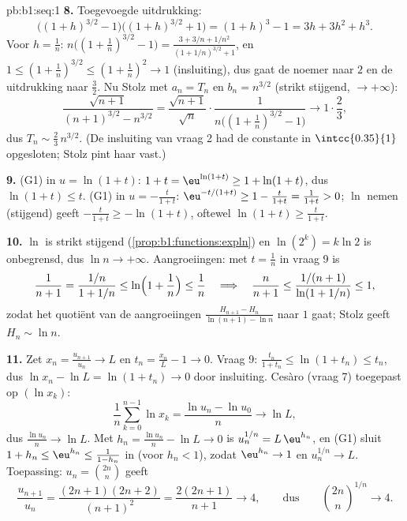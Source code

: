 \begin{solution}{pb:b1:seq:1}
\textbf{8.} Toegevoegde uitdrukking:
\[
\bigl((1+h)^{3/2} - 1\bigr)\bigl((1+h)^{3/2} + 1\bigr)
= (1+h)^3 - 1 = 3h + 3h^2 + h^3 .
\]
Voor $h = \frac1n$: $n\bigl((1 + \frac1n)^{3/2} - 1\bigr) = \frac{3 + 3/n
+ 1/n^2}{(1 + 1/n)^{3/2} + 1}$, en $1 \leq (1 + \frac1n)^{3/2} \leq (1 +
\frac1n)^2 \to 1$ (insluiting), dus gaat de noemer naar $2$ en de
uitdrukking naar $\frac32$. Nu Stolz met $a_n = T_n$ en $b_n = n^{3/2}$
(strikt stijgend, $\to +\infty$):
\[
\frac{\sqrt{n+1}}{(n+1)^{3/2} - n^{3/2}}
= \frac{\sqrt{n+1}}{\sqrt n} \cdot
\frac{1}{n\bigl((1 + \frac1n)^{3/2} - 1\bigr)}
\longrightarrow 1 \cdot \frac{2}{3},
\]
dus $T_n \sim \frac23\,n^{3/2}$. (De insluiting van vraag 2 had de
constante in $\intcc{0.35}{1}$ opgesloten; Stolz pint haar vast.)

\textbf{9.} (G1) in $u = \ln(1+t)$: $1 + t = \eu^{\ln(1+t)} \geq 1 +
\ln(1+t)$, dus $\ln(1+t) \leq t$. (G1) in $u = -\frac{t}{1+t}$:
$\eu^{-t/(1+t)} \geq 1 - \frac{t}{1+t} = \frac{1}{1+t} > 0$; $\ln$ nemen
(stijgend) geeft $-\frac{t}{1+t} \geq -\ln(1+t)$, oftewel $\ln(1+t) \geq
\frac{t}{1+t}$.

\textbf{10.} $\ln$ is strikt stijgend (\cref{prop:b1:functions:expln}) en
$\ln(2^k) = k\ln 2$ is onbegrensd, dus $\ln n \to +\infty$.
Aangroeiingen: met $t = \frac1n$ in vraag 9 is
\[
\frac 1{n+1} = \frac{1/n}{1 + 1/n} \leq
\ln\Bigl(1 + \frac1n\Bigr) \leq \frac1n
\quad\Longrightarrow\quad
\frac{n}{n+1} \leq \frac{1/(n+1)}{\ln(1 + 1/n)} \leq 1 ,
\]
zodat het quotiënt van de aangroeiingen $\frac{H_{n+1} -
H_n}{\ln(n+1) - \ln n}$ naar $1$ gaat; Stolz geeft $H_n \sim \ln n$.

\textbf{11.} Zet $x_n = \frac{u_{n+1}}{u_n} \to L$ en $t_n =
\frac{x_n}{L} - 1 \to 0$. Vraag 9: $\frac{t_n}{1 + t_n} \leq \ln(1 + t_n)
\leq t_n$, dus $\ln x_n - \ln L = \ln(1 + t_n) \to 0$ door insluiting.
Cesàro (vraag 7) toegepast op $(\ln x_k)$:
\[
\frac1n \sum_{k=0}^{n-1} \ln x_k = \frac{\ln u_n - \ln u_0}{n}
\longrightarrow \ln L ,
\]
dus $\frac{\ln u_n}{n} \to \ln L$. Met $h_n = \frac{\ln u_n}{n} - \ln L
\to 0$ is $u_n^{1/n} = L\,\eu^{h_n}$, en (G1) sluit $1 + h_n \leq
\eu^{h_n} \leq \frac{1}{1 - h_n}$ in (voor $h_n < 1$), zodat $\eu^{h_n}
\to 1$ en $u_n^{1/n} \to L$. Toepassing: $u_n = \binom{2n}{n}$ geeft
\[
\frac{u_{n+1}}{u_n} = \frac{(2n+1)(2n+2)}{(n+1)^2}
= \frac{2(2n+1)}{n+1} \longrightarrow 4 ,
\qquad\text{dus}\qquad
\binom{2n}{n}^{1/n} \to 4 .
\]


\end{solution}
